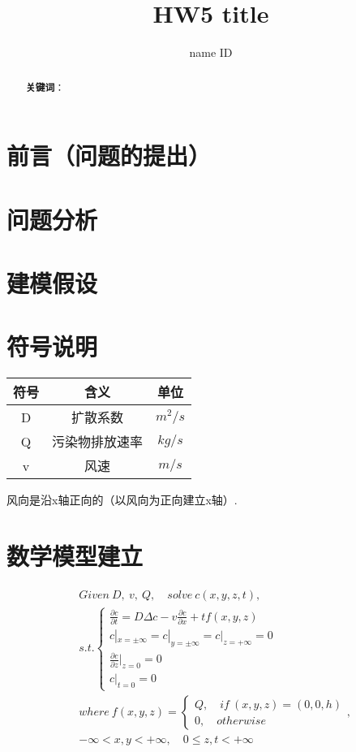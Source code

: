 \documentclass{article}
\title{\bfseries HW5 title}
\author{name \quad ID}
\begin{document}
	\maketitle
	\begin{abstract}
		
		\par \textbf{关键词}：
	\end{abstract}
	\setcounter{section}{0}
	
	\section{前言（问题的提出）}
	
	\section{问题分析}
	
	\section{建模假设}
	
	\section{符号说明}
	\begin{table}[htbp]
		\centering
		\begin{tabular}{ccc}
			\hline
			符号 & 含义 & 单位 \\
			\hline
			D & 扩散系数 & $m^2/s$ \\
			Q & 污染物排放速率 & $kg/s$ \\
			v & 风速 & $m/s$ \\
			\hline
		\end{tabular}
	\end{table}
	风向是沿x轴正向的（以风向为正向建立x轴）.
	
	\section{数学模型建立}
	\begin{align*}
		&Given ~ D, ~ v, ~ Q, \quad solve ~ c(x,y,z,t),\\
		&s.t.
		\begin{cases}
			\frac{\partial c}{\partial t} = D\Delta c - v\frac{\partial c}{\partial x} + tf(x,y,z)	\\
			c|_{x=\pm\infty}=c|_{y=\pm\infty}=c|_{z=+\infty}=0	\\
			\frac{\partial c}{\partial z}|_{z=0} = 0	\\
			c|_{t=0}=0
		\end{cases}\\
		&where  ~
		f(x,y,z) = 
		\begin{cases}
			Q, \quad if~(x, y, z)=(0, 0, h)\\
			0, \quad otherwise
		\end{cases},\\
		&-\infty<x, y<+\infty, \quad 0\leq z, t<+\infty
	\end{align*}
	
\end{document}
